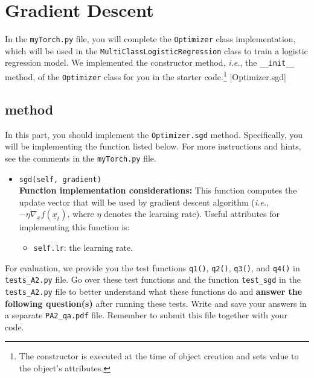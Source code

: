 \documentclass{article}
\theoremstyle{definition}
\begin{document}
\section{Gradient Descent}
In the \verb|myTorch.py| file, you will complete the \verb|Optimizer| class implementation, which will be used in the \verb|MultiClassLogisticRegression| class to train a logistic regression model. We implemented the constructor method, \emph{i.e.}, the \verb|__init__| method, of the \verb|Optimizer| class for you in the starter code.\footnote{The constructor is executed at the time of object creation and sets value to the object's attributes.}
|Optimizer.sgd|
\subsection{ method}\label{partsgd}
In this part, you should implement the  \verb|Optimizer.sgd| method. Specifically, you will be implementing the function listed below. For more instructions and hints, see the comments in the \verb|myTorch.py| file.
\begin{itemize}
	\item{\verb|sgd(self, gradient)|\\\textbf{Function implementation considerations:}
		This function computes the update vector that will be used by gradient descent algorithm (\emph{i.e.}, $-\eta \nabla_{\!\underline{x}}f(\underline{x}_t)$, where $\eta$ denotes the learning rate). 
		Useful attributes for implementing this function is: 
		\begin{itemize}
			\item \verb|self.lr|: the learning rate.
		\end{itemize}}
\end{itemize}
For evaluation, we provide you the test functions \verb|q1()|, \verb|q2()|, \verb|q3()|, and \verb|q4()| in \verb|tests_A2.py| file. Go over these test functions and the function \verb|test_sgd| in the \verb|tests_A2.py| file to better understand what these functions do and \textbf{answer the following question(s)} after running these tests. Write and save your answers in a separate \verb|PA2_qa.pdf| file. Remember
to submit this file together with your code.
\end{document}
